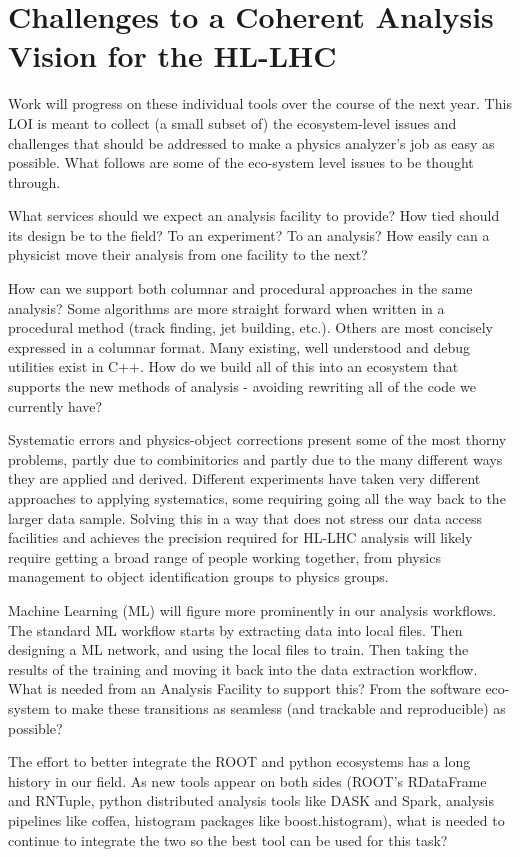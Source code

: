 \documentclass{article}
\begin{document}
\section*{Challenges to a Coherent Analysis Vision for the HL-LHC}

Work will progress on these individual tools over the course of the next year. This LOI is meant to collect (a small subset of) the ecosystem-level issues and challenges that should be addressed to make a physics analyzer's job as easy as possible. What follows are some of the eco-system level issues to be thought through.

What services should we expect an analysis facility to provide? How tied should its design be to the field? To an experiment? To an analysis? How easily can a physicist move their analysis from one facility to the next?

How can we support both columnar and procedural approaches in the same analysis? Some algorithms are more straight forward when written in a procedural method (track finding, jet building, etc.). Others are most concisely expressed in a columnar format. Many existing, well understood and debug utilities exist in C++. How do we build all of this into an ecosystem that supports the new methods of analysis - avoiding rewriting all of the code we currently have?

Systematic errors and physics-object corrections present some of the most thorny problems, partly due to combinitorics and partly due to the many different ways they are applied and derived. Different experiments have taken very different approaches to applying systematics, some requiring going all the way back to the larger data sample. Solving this in a way that does not stress our data access facilities and achieves the precision required for HL-LHC analysis will likely require getting a broad range of people working together, from physics management to object identification groups to physics groups.

Machine Learning (ML) will figure more prominently in our analysis workflows. The standard ML workflow starts by extracting data into local files. Then designing a ML network, and using the local files to train. Then taking the results of the training and moving it back into the data extraction workflow. What is needed from an Analysis Facility to support this? From the software eco-system to make these transitions as seamless (and trackable and reproducible) as possible?

The effort to better integrate the ROOT and python ecosystems has a long history in our field\cite{bridges-and-ferries}. As new tools appear on both sides (ROOT's RDataFrame and RNTuple, python distributed analysis tools like DASK and Spark, analysis pipelines like coffea, histogram packages like boost.histogram), what is needed to continue to integrate the two so the best tool can be used for this task?
\end{document}
